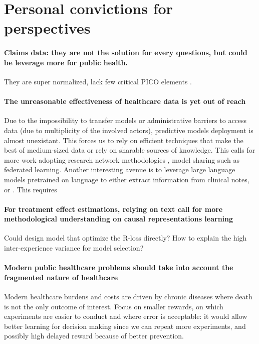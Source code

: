 \documentclass[french,12pt,twoside,a4paper]{book}
\begin{document}
\section{Personal convictions for perspectives}

\paragraph{Claims data: they are not the solution for every questions, but could
  be leverage more for public health.} They are super normalized, lack
few critical PICO elements \citep{caruana2023administrative}.

\paragraph{The unreasonable effectiveness of healthcare data is yet out of
  reach} Due to the impossibility to transfer models or administrative barriers
to access data (due to multiplicity of the involved actors), predictive models
deployment is almost unexistant.  This forces us to rely on efficient techniques that make the
best of medium-sized data or rely on sharable sources of knowledge. This calls
for more work adopting research network methodologies
\citep{hripcsak2015observational}, model sharing such as federated learning.
Another interesting avenue is to leverage large language models pretrained on
language to either extract information from clinical notes, or . This requires


\paragraph{For treatment effect estimations, relying on text call for more
  methodological understanding on causal representations learning}

Could design model that optimize the R-loss directly? How to explain the high
inter-experience variance for model selection?



%
\paragraph{Modern public healthcare problems should take into account the
  fragmented nature of healthcare} Modern healthcare burdens and costs are driven
by chronic diseases where death is not the only outcome of interest. Focus on
smaller rewards, on which experiments are easier to conduct and where error is
acceptable: it would allow better learning for decision making since we can
repeat more experiments, and possibly high delayed reward because of better
prevention.
\end{document}
